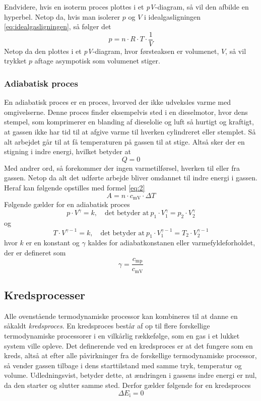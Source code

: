 \documentclass[SRC.tex]{subfiles}
\begin{document}
	Endvidere, hvis en isoterm proces plottes i et \textit{pV}-diagram, så 
	vil den afbilde en hyperbel. Netop da, hvis man isolerer \(p\) og \(V\)
	i idealgasligningen \eqref{eq:idealgasligningen}, så følger det
	\begin{equation}
	p = n \cdot R \cdot T \cdot \frac{1}{V}
	\end{equation}
	Netop da den plottes i et \textit{pV}-diagram, hvor førsteaksen er volumenet,
	\(V\), så vil trykket \(p\) aftage asympotisk som volumenet stiger. 
	\subsubsection{Adiabatisk proces}
	En adiabatisk proces er en proces, hvorved der ikke udveksles varme med 
	omgivelserne. Denne proces finder eksempelvis sted i en dieselmotor, hvor dens 
	stempel, som komprimerer en blanding af dieselolie og luft så hurtigt og kraftigt,
	at gassen ikke har tid til at afgive varme til hverken cylindreret eller stemplet. Så alt arbejdet går til at få temperaturen på gassen til at stige. Altså sker der en stigning i indre energi, hvilket betyder at 
	\begin{equation}
	Q = 0
	\end{equation}
	Med andrer ord, så forekommer der ingen varmetilførsel, hverken til eller fra gassen. Netop da 
	alt det udførte arbejde bliver omdannet til indre energi i gassen. Heraf kan
	følgende opstilles med formel \eqref{eq:2}
	\begin{equation}
	A = n \cdot c_{\text{mV}} \cdot \Delta T 
	\end{equation}
	Følgende gælder for en adiabatisk proces
	\begin{equation}
	p \cdot V^\gamma = k,\quad \text{det betyder at}\ p_1 \cdot V_1^\gamma= p_2 \cdot V_2^\gamma
	\end{equation}
	og 
	\begin{equation}
	T \cdot V^{\gamma-1} = k,\quad \text{det betyder at}\ p_1 \cdot V_1^{\gamma-1}= T_2 \cdot V_2^{\gamma-1}
	\end{equation}
	hvor \(k\) er en konstant og \(\gamma\) kaldes
	for adiabatkonstanen eller varmefyldeforholdet, der er defineret som
	\begin{equation}
	\gamma = \frac{c_{\textrm{mp}}}{c_{\textrm{mV}}}
	\end{equation}
	\subsection{Kredsprocesser}
	Alle ovenstående termodynamiske processor kan kombineres til at danne
	en såkaldt \textit{kredsproces}. En kredsproces består af op til flere 
	forskellige termodynamiske processorer i en vilkårlig rækkefølge, som en gas i 
	et lukket system ville opleve. Det definerende ved en kredsproces er at det fungere som en kreds, altså at efter alle påvirkninger
	fra de forskellige termodynamiske processor, så vender gassen tilbage i dens starttilstand med
	samme tryk, temperatur og volume. Udledningsvist, betyder dette, at ændringen 
	i gassens indre energi er nul, da den starter og slutter samme sted. Derfor gælder følgende for en kredsproces
	\begin{equation}
	\Delta E_\text{i} = 0
	\end{equation} 
\end{document}
